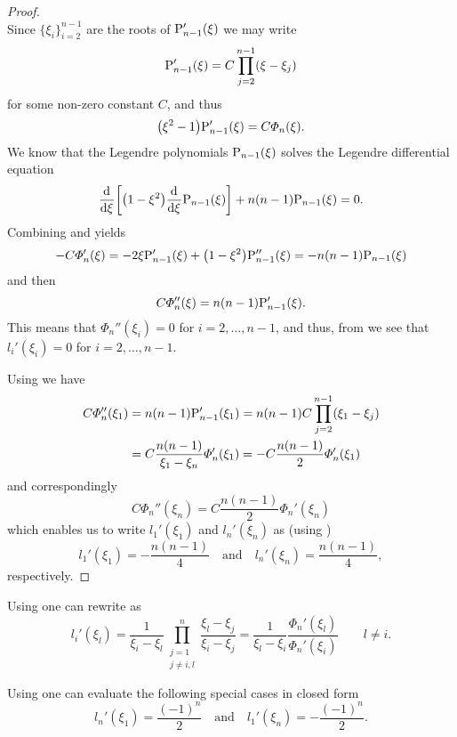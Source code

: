 \begin{proof}
\begin{equation}
	\end{equation}
	Since $\{\xi_i\}_{i=2}^{n-1}$ are the roots of $\mathrm{P}_{n-1}'(\xi)$ we may write
	\begin{equation}\label{Eq5:LegendreDeriv}
		\mathrm{P}_{n-1}'(\xi) = C\prod_{j=2}^{n-1}(\xi-\xi_j)
	\end{equation}
	for some non-zero constant $C$, and thus
	\begin{equation}\label{Eq5:LegendrePhiCouple}
		 \left(\xi^2-1\right)\legendre_{n-1}'(\xi) = C\Phi_n(\xi).
	\end{equation}
	We know that the Legendre polynomials $\mathrm{P}_{n-1}(\xi)$ solves the Legendre differential equation
	\begin{equation}\label{Eq5:LegendreDiff}
		\deriv{}{\xi}\left[\left(1-\xi^2\right)\deriv{}{\xi}\legendre_{n-1}(\xi)\right] + n(n-1)\legendre_{n-1}(\xi) = 0.
	\end{equation}
	Combining  and  yields
	\begin{equation*}
		-C\Phi_n'(\xi) = -2\xi \legendre_{n-1}'(\xi) + \left(1-\xi^2\right)\legendre_{n-1}''(\xi) = -n(n-1)\legendre_{n-1}(\xi)
	\end{equation*}
	and then
	\begin{equation}\label{Eq5:LegendrePhiCouple2}
		C\Phi_n''(\xi) = n(n-1)\mathrm{P}_{n-1}'(\xi).
	\end{equation}
	This means that $\Phi_n''(\xi_i)=0$ for $i=2,\dots,n-1$, and thus, from  we see that $l_i'(\xi_i)=0$ for $i=2,\dots,n-1$.
	
	Using  we have
	\begin{align*}
		C\Phi_n''(\xi_1) &= n(n-1)\mathrm{P}_{n-1}'(\xi_1) = n(n-1)C\prod_{j=2}^{n-1} (\xi_1-\xi_j) \\
		&= C\frac{n(n-1)}{\xi_1-\xi_n} \Phi_n'(\xi_1)  = -C\frac{n(n-1)}{2} \Phi_n'(\xi_1) 
	\end{align*}
	and correspondingly
	\begin{equation*}
		C\Phi_n''(\xi_n) = C\frac{n(n-1)}{2} \Phi_n'(\xi_n) 
	\end{equation*}
	which enables us to write $l_1'(\xi_1)$ and $l_n'(\xi_n)$ as (using )
	\begin{equation*}
		l_1'(\xi_1) =- \frac{n(n-1)}{4}\quad\text{and}\quad l_n'(\xi_n) = \frac{n(n-1)}{4},
	\end{equation*}
	respectively.
\end{proof}
\begin{remark}
	Using  one can rewrite  as
	\begin{equation*}
	l_i'(\xi_l) = \frac{1}{\xi_i-\xi_l}\prod_{\substack{j = 1\\  j\neq i,l}}^n\frac{\xi_l-\xi_j}{\xi_i-\xi_j}= \frac{1}{\xi_l-\xi_i}\frac{\Phi_n'(\xi_l)}{\Phi_n'(\xi_i)}\qquad l \neq i.
	\end{equation*}
\end{remark}
\begin{remark}
	Using  one can evaluate the following special cases in closed form
	\begin{equation*}
	l_n'(\xi_1) = \frac{(-1)^n}{2}\quad\text{and}\quad l_1'(\xi_n) = -\frac{(-1)^n}{2}.
	\end{equation*}
\end{remark}